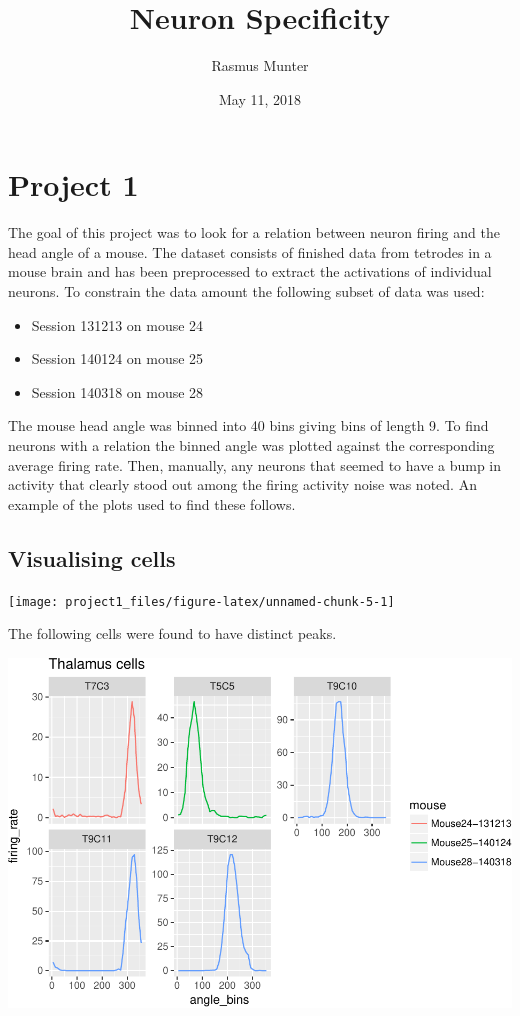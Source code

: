 \documentclass[]{article}
\title{Neuron Specificity}
\author{Rasmus Munter}
\date{May 11, 2018}
\providecommand{\tightlist}{%
  \setlength{\itemsep}{0pt}\setlength{\parskip}{0pt}}
\begin{document}
\maketitle

\section{Project 1}\label{project-1}

The goal of this project was to look for a relation between neuron
firing and the head angle of a mouse. The dataset consists of finished
data from tetrodes in a mouse brain and has been preprocessed to extract
the activations of individual neurons. To constrain the data amount the
following subset of data was used:

\begin{itemize}
\tightlist
\item
  Session 131213 on mouse 24
\item
  Session 140124 on mouse 25
\item
  Session 140318 on mouse 28
\end{itemize}

The mouse head angle was binned into 40 bins giving bins of length 9. To
find neurons with a relation the binned angle was plotted against the
corresponding average firing rate. Then, manually, any neurons that
seemed to have a bump in activity that clearly stood out among the
firing activity noise was noted. An example of the plots used to find
these follows.

\subsection{Visualising cells}\label{visualising-cells}

\begin{center}\texttt{[image: project1\_files/figure-latex/unnamed-chunk-5-1]} \end{center}

The following cells were found to have distinct peaks.

\begin{center}\includegraphics{project1_files/figure-latex/unnamed-chunk-13-1} \end{center}
\end{document}
